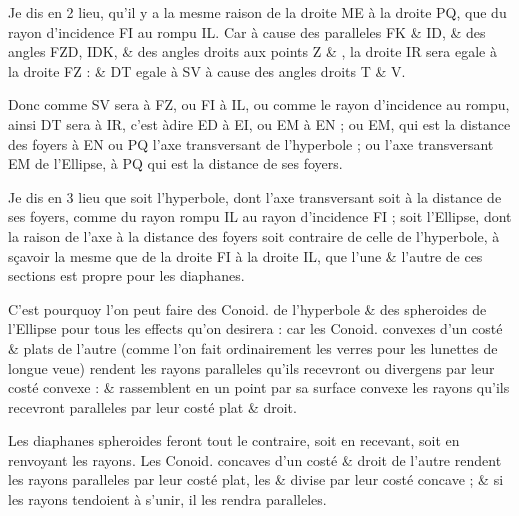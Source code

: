 \documentclass[11pt,a4paper]{article}
\begin{document}
Je dis en 2 lieu, qu'il y a la mesme raison de la droite ME à la droite PQ, que du rayon d'incidence FI au rompu IL. Car à cause des \struck{\ill{}}  paralleles FK \& ID, \& des angles FZD, IDK, \& des angles droits aux points Z \& , la droite IR sera egale à la droite FZ : \& DT \struck{\ill{}} egale à SV à cause des angles droits T \& V.

Donc comme SV sera à FZ, ou FI à IL, ou comme le rayon d'incidence au rompu, ainsi DT sera à IR, c'est àdire ED à EI, ou EM à EN ; ou EM, qui est la distance des foyers à EN ou PQ l'axe transversant de l'hyperbole ; ou  l'axe transversant EM de l'Ellipse, à PQ qui est la distance de ses foyers.

Je dis en 3 lieu que soit l'hyperbole, dont l'axe transversant soit à la distance de ses foyers, comme du rayon rompu IL \struck{\ill{}} au rayon d'incidence FI ; soit l'Ellipse, dont la raison de l'axe à la distance des foyers soit contraire de celle de l'hyperbole, à sçavoir la mesme que de la droite FI à la droite IL, que l'une \& l'autre de ces sections est propre pour les \struck{\ill{}} diaphanes.

C'est pourquoy l'on peut faire des Conoid.  de l'hyperbole \& des spheroides de l'Ellipse pour tous les effects qu'on desirera : car les Conoid. convexes d'un costé \& \struck{\ill{}} plats de l'autre (comme l'on fait ordinairement les verres pour les lunettes de longue veue) rendent les rayons paralleles qu'ils recevront  ou divergens par leur costé convexe : \& rassemblent en un point  par sa surface convexe les rayons qu'ils recevront paralleles par leur costé plat \& droit.

Les diaphanes spheroides feront tout le contraire, soit en recevant, soit en renvoyant les rayons. Les Conoid. concaves d'un costé \& droit de l'autre rendent les rayons paralleles par leur \struck{\ill{}} costé plat, les  \& divise par leur costé concave ; \& si les rayons \struck{\ill{}} tendoient à s'unir, il les rendra paralleles.

\end{document}

